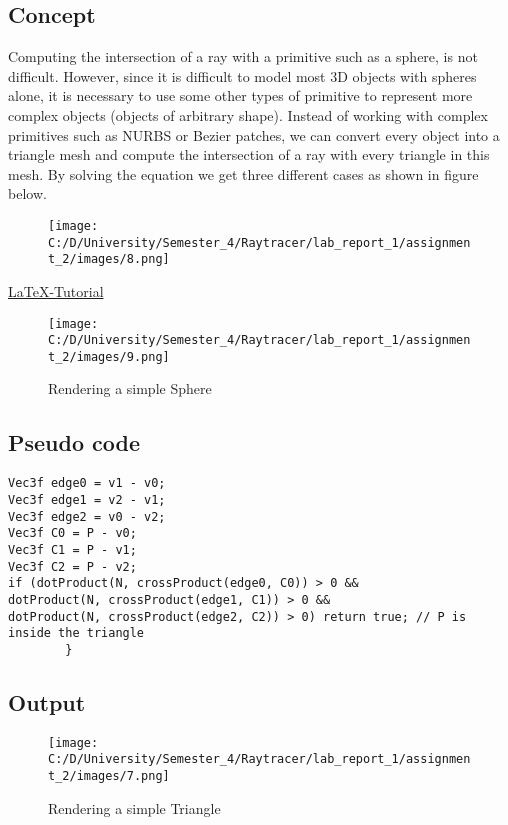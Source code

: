 \documentclass{article}
\begin{document}
\subsection{Concept}
Computing the intersection of a ray with a primitive such as a sphere, is not difficult. However, since it is difficult to model most 3D objects with spheres alone, it is necessary to use some other types of primitive to represent more complex objects (objects of arbitrary shape).
Instead of working with complex primitives such as NURBS or Bezier patches, we can convert every object into a triangle mesh and compute the intersection of a ray with every triangle in this mesh. 
By solving the equation we get three different cases as shown in figure below.
\begin{figure}[h]
	
	\texttt{[image: C:/D/University/Semester\_4/Raytracer/lab\_report\_1/assignment\_2/images/8.png]}
	\label{fig:boat1}
\end{figure}
\href{https://en.wikipedia.org/wiki/Line%E2%80%93sphere_intersection}{LaTeX-Tutorial}
	
		\begin{figure}[h]
		\begin{center}
			\texttt{[image: C:/D/University/Semester\_4/Raytracer/lab\_report\_1/assignment\_2/images/9.png]}
			
			\caption{Rendering a simple Sphere}
			\label{fig:boat1}
		\end{center}
	\end{figure}
	\subsection{Pseudo code}
	\begin{lstlisting}
Vec3f edge0 = v1 - v0; 
Vec3f edge1 = v2 - v1; 
Vec3f edge2 = v0 - v2; 
Vec3f C0 = P - v0; 
Vec3f C1 = P - v1; 
Vec3f C2 = P - v2; 
if (dotProduct(N, crossProduct(edge0, C0)) > 0 && 
dotProduct(N, crossProduct(edge1, C1)) > 0 && 
dotProduct(N, crossProduct(edge2, C2)) > 0) return true; // P is inside the triangle 
		}
	\end{lstlisting}
	
	
	\subsection{Output}
	\begin{figure}[h]
		\begin{center}
			\texttt{[image: C:/D/University/Semester\_4/Raytracer/lab\_report\_1/assignment\_2/images/7.png]}
			
			\caption{Rendering a simple Triangle}
			\label{fig:boat1}
		\end{center}
	\end{figure}
\end{document}
